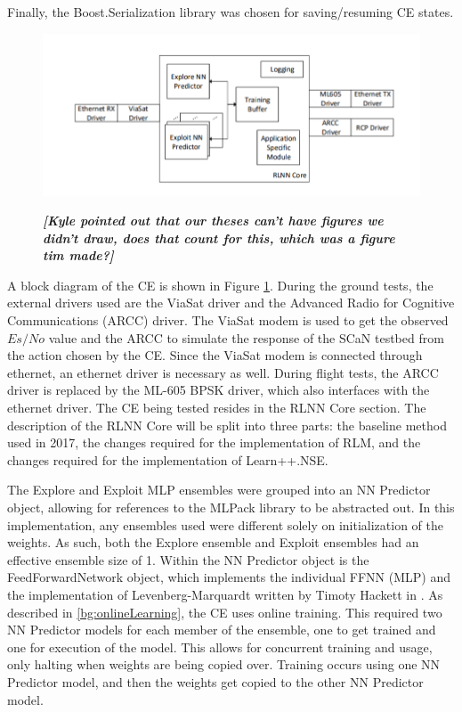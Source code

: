\par Finally, the Boost.Serialization \cite{placeholderCitation} library was chosen for saving/resuming CE states. 
\begin{figure}
\caption{\textbf{\textit{[Kyle pointed out that our theses can't have figures we didn't draw, does that count for this, which was a figure tim made?]}}}
\includegraphics[width=\textwidth]{figures/driverList_tmp.png}
\label{fig:timOutlineBlocks}
\end{figure}
\par A block diagram of the CE is shown in Figure \ref{fig:timOutlineBlocks}. During the ground tests, the external drivers used are the ViaSat driver and the Advanced Radio for Cognitive Communications (ARCC) driver. The ViaSat modem is used to get the observed $Es/No$ value and the ARCC to simulate the response of the SCaN testbed from the action chosen by the CE. Since the ViaSat modem is connected through ethernet, an ethernet driver is necessary as well. During flight tests, the ARCC driver is replaced by the ML-605 BPSK driver, which also interfaces with the ethernet driver. The CE being tested resides in the RLNN Core section. The description of the RLNN Core will be split into three parts: the baseline method used in 2017, the changes required for the implementation of RLM, and the changes required for the implementation of Learn++.NSE.
\par The Explore and Exploit MLP ensembles were grouped into an NN Predictor object, allowing for references to the MLPack library to be abstracted out. In this implementation, any ensembles used were different solely on initialization of the weights. As such, both the Explore ensemble and Exploit ensembles had an effective ensemble size of 1. Within the NN Predictor object is the FeedForwardNetwork object, which implements the individual FFNN (MLP) and the implementation of Levenberg-Marquardt written by Timoty Hackett in \cite{tim_implementation_paper}. As described in \ref{bg:onlineLearning}, the CE uses online training. This required two NN Predictor models for each member of the ensemble, one to get trained and one for execution of the model. This allows for concurrent training and usage, only halting when weights are being copied over. Training occurs using one NN Predictor model, and then the weights get copied to the other NN Predictor model. 
